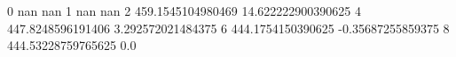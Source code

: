 0 nan nan
1 nan nan
2 459.1545104980469 14.622222900390625
4 447.8248596191406 3.292572021484375
6 444.1754150390625 -0.35687255859375
8 444.53228759765625 0.0
